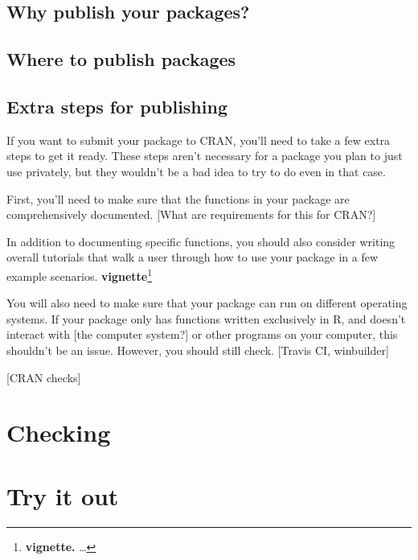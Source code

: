 \documentclass[]{tufte-book}
\begin{document}
\hypertarget{why-publish-your-packages}{%
\subsection{Why publish your packages?}\label{why-publish-your-packages}}

\hypertarget{where-to-publish-packages}{%
\subsection{Where to publish packages}\label{where-to-publish-packages}}

\hypertarget{extra-steps-for-publishing}{%
\subsection{Extra steps for publishing}\label{extra-steps-for-publishing}}

If you want to submit your package to CRAN, you'll need to take a few extra steps
to get it ready. These steps aren't necessary for a package you plan to just
use privately, but they wouldn't be a bad idea to try to do even in that case.

First, you'll need to make sure that the functions in your package are
comprehensively documented. {[}What are requirements for this for CRAN?{]}

In addition to documenting specific functions, you should also consider
writing overall tutorials that walk a user through how to use your
package in a few example scenarios. \textbf{vignette}\footnote{\textbf{vignette.} \ldots{}}

You will also need to make sure that your package can run on different
operating systems. If your package only has functions written exclusively
in R, and doesn't interact with {[}the computer system?{]} or other programs
on your computer, this shouldn't be an issue. However, you should still
check. {[}Travis CI, winbuilder{]}

{[}CRAN checks{]}

\hypertarget{checking}{%
\section{Checking}\label{checking}}

\hypertarget{try-it-out}{%
\section{Try it out}\label{try-it-out}}
\end{document}

